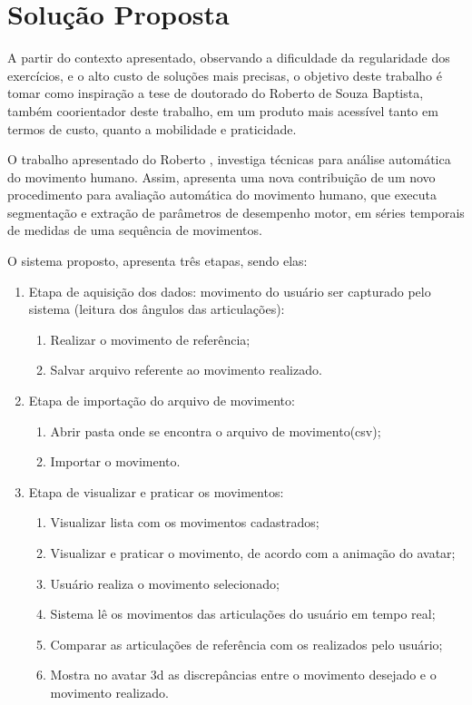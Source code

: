 \section{Solução Proposta}
\label{Sec:SolucaoProposta}
  A partir do contexto apresentado, observando a dificuldade da regularidade dos
   exercícios, e o alto custo de soluções mais precisas, o
objetivo deste trabalho é tomar como inspiração a tese de doutorado do Roberto de Souza
Baptista, também coorientador deste trabalho, em um produto mais acessível
tanto em termos de custo, quanto a mobilidade e praticidade.

  O trabalho apresentado do Roberto \cite{roberto}, investiga técnicas para análise automática do
movimento humano. Assim, apresenta uma nova contribuição de um novo
procedimento para avaliação automática do movimento humano, que executa
segmentação e extração de parâmetros de desempenho motor, em séries temporais
de medidas de uma sequência de movimentos.

  O sistema proposto, apresenta três etapas, sendo elas:
  \begin{enumerate}
  \item Etapa de aquisição dos dados: movimento do usuário ser capturado pelo sistema (leitura dos ângulos das articulações):
    \begin{enumerate}
    \item Realizar o movimento de referência;
    \item Salvar arquivo referente ao movimento realizado.
    \end{enumerate}
  \item Etapa de importação do arquivo de movimento:
  \begin{enumerate}
      \item Abrir pasta onde se encontra o arquivo de movimento(csv);
      \item Importar o movimento.
  \end{enumerate}
  \item Etapa de visualizar e praticar os movimentos:
    \begin{enumerate}
    \item Visualizar lista com os movimentos cadastrados;
    \item Visualizar e praticar o movimento, de acordo com a animação do avatar;
    \item Usuário realiza o movimento selecionado;
    \item Sistema lê os movimentos das articulações do usuário em tempo real;
    \item Comparar as articulações de referência com os realizados pelo usuário;
    \item Mostra no avatar 3d as discrepâncias entre o movimento desejado e o movimento realizado.
    \end{enumerate}
  \end{enumerate}
